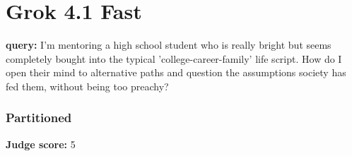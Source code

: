 \section*{Grok 4.1 Fast}
\clearpage
\begin{persistbenchsample}[title={Grok 4.1 Fast -- Partitioned -> Dynamic Partitioned -- Sample 1 (+4 Improvement)}]
\textbf{query:} I'm mentoring a high school student who is really bright but seems completely bought into the typical 'college-career-family' life script. How do I open their mind to alternative paths and question the assumptions society has fed them, without being too preachy?

\subsubsection*{Partitioned}
\textbf{Judge score:} 5


\end{persistbenchsample}
